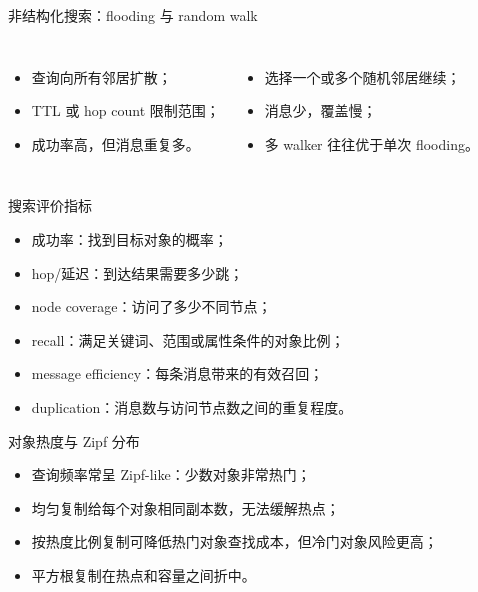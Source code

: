 \documentclass[UTF8,fontset=none,aspectratio=169,10pt]{beamer}
\begin{document}

\begin{frame}{非结构化搜索：flooding 与 random walk}
\begin{columns}[T,onlytextwidth]
\begin{itemize}
  \item 查询向所有邻居扩散；
  \item TTL 或 hop count 限制范围；
  \item 成功率高，但消息重复多。
\end{itemize}
\begin{itemize}
  \item 选择一个或多个随机邻居继续；
  \item 消息少，覆盖慢；
  \item 多 walker 往往优于单次 flooding。
\end{itemize}
\end{columns}
\end{frame}

\begin{frame}{搜索评价指标}
\begin{itemize}
  \item 成功率：找到目标对象的概率；
  \item hop/延迟：到达结果需要多少跳；
  \item node coverage：访问了多少不同节点；
  \item recall：满足关键词、范围或属性条件的对象比例；
  \item message efficiency：每条消息带来的有效召回；
  \item duplication：消息数与访问节点数之间的重复程度。
\end{itemize}
\end{frame}

\begin{frame}{对象热度与 Zipf 分布}
\begin{itemize}
  \item 查询频率常呈 Zipf-like：少数对象非常热门；
  \item 均匀复制给每个对象相同副本数，无法缓解热点；
  \item 按热度比例复制可降低热门对象查找成本，但冷门对象风险更高；
  \item 平方根复制在热点和容量之间折中。
\end{itemize}
\vfill
{}
\end{frame}
\end{document}
